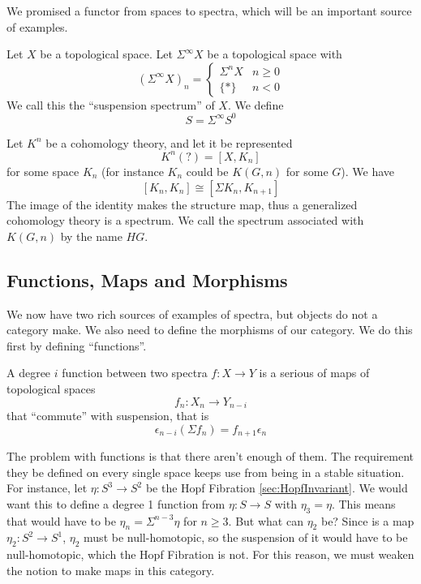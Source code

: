 We promised a functor from spaces to spectra, which will be an important source of examples.  

\begin{Def}
  Let $X$ be a topological space.  Let $\Sigma^\infty X$ be a topological space with
  \[(\Sigma^\infty X)_n = \left\{\begin{array}{cc} 
  \Sigma^n X & n \ge 0\\
  \{*\} & n < 0
  \end{array}\right.\]
  We call this the ``suspension spectrum'' of $X$.
  We define 
  \[S=\Sigma^\infty S^0\]
\end{Def}


Let $K^n$ be a cohomology theory, and let it be represented
\[K^n(?)=[X,K_n]\]
for some space $K_n$ (for instance $K_n$ could be $K(G,n)$ for some $G$).  
We have
\[[K_n,K_n]\cong[\Sigma K_n,K_{n+1}]\]
The image of the identity makes the structure map, thus a generalized cohomology theory is a spectrum.  
We call the spectrum associated with $K(G,n)$ by the name $HG$.  


\subsection{Functions, Maps and Morphisms}

We now have two rich sources of examples of spectra, but objects do not a category make.  
We also need to define the morphisms of our category.  
We do this first by defining ``functions''.  
\begin{Def}
  A degree $i$ function between two spectra $f:X\to Y$ is a serious of maps of topological spaces 
  \[f_n:X_n\to Y_{n-i}\]
  that ``commute'' with suspension, that is
  \[\epsilon_{n-i}(\Sigma f_n)=f_{n+1}\epsilon_n\]
\end{Def}

The problem with functions is that there aren't enough of them.  
The requirement they be defined on every single space keeps use from being in a stable situation.  
For instance, let $\eta:S^3\to S^2$ be the Hopf Fibration \ref{sec:HopfInvariant}.  
We would want this to define a degree 1 function from $\eta:S\to S$ with $\eta_3=\eta$.  
This means that would have to be $\eta_n=\Sigma^{n-3}\eta$ for $n\ge 3$.  
But what can $\eta_2$ be?  Since is a map $\eta_2:S^2\to S^1$, $\eta_2$ must be null-homotopic, so the suspension of it would have to be null-homotopic, 
which the Hopf Fibration is not.  
For this reason, we must weaken the notion to make maps in this category.  

